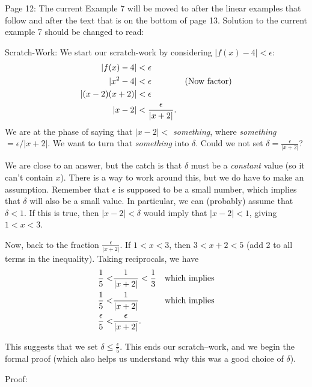 \documentclass[10pt]{article}
\newcommand{\ds}{\displaystyle}
\begin{document}
Page 12: The current Example 7 will be moved to after the linear examples that follow and after the text that is on the bottom of page 13. Solution to the current example 7 should be changed to read:  

Scratch-Work:
We start our scratch-work by considering $|f(x)-4| < \epsilon$:
\begin{align}
|f(x)-4| &< \epsilon \notag\\
|x^2-4|&< \epsilon & \text{(Now factor)}\notag\\
|(x-2)(x+2)|&< \epsilon \notag\\
|x-2| &<\frac{\epsilon}{|x+2|}.\label{eq:lim1}
\end{align}
We are at the phase of saying that $|x-2|<$ \textit{something}, where \textit{something}$=\epsilon/|x+2|$. We want to turn that \textit{something} into $\delta$. Could we not set $\displaystyle \delta = \frac{\epsilon}{|x+2|}$?  

We are close to an answer, but the catch is that $\delta$ must be a \textit{constant} value (so it can't contain $x$).  There is a way to work around this, but we do have to make an assumption.  Remember that $\epsilon$ is supposed to be a small number, which implies that $\delta$ will also be a small value.  In particular, we can (probably) assume that $\delta < 1$.  If this is true, then $|x-2| < \delta$ would imply that $|x-2| < 1$, giving $1 < x < 3$.  

Now, back to the fraction $\displaystyle \frac{\epsilon}{|x+2|}$.  If $1<x<3$, then $3<x+2<5$ (add 2 to all terms in the inequality).  Taking reciprocals, we have 
\begin{align}
\frac15 <& \frac1{|x+2|} < \frac 13 & \text{which implies}\notag\\
\frac15 <& \frac1{|x+2|} & \text{which implies}\notag\\
\frac\epsilon5<&\frac{\epsilon}{|x+2|}\text{.} \label{eq:lim2}
\end{align}

This suggests that we set $\ds \delta \leq \frac{\epsilon}{5}$. This ends our scratch--work, and we begin the formal proof (which also helps us understand why this was a good choice of $\delta$).

Proof:
\end{document}
